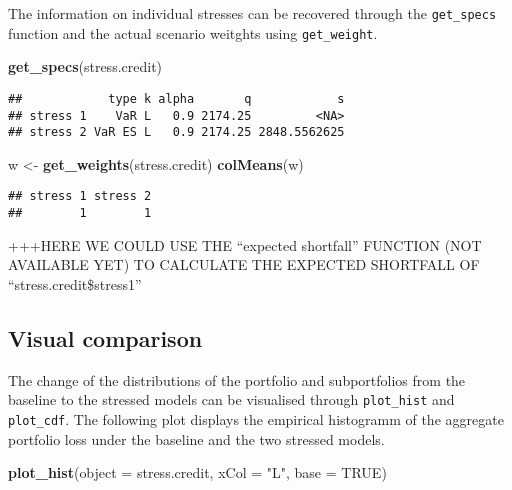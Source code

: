 \documentclass[]{article}
\newenvironment{Shaded}{\begin{snugshade}}{\end{snugshade}}
\newcommand{\DataTypeTok}[1]{\textcolor[rgb]{0.13,0.29,0.53}{#1}}
\newcommand{\KeywordTok}[1]{\textcolor[rgb]{0.13,0.29,0.53}{\textbf{#1}}}
\newcommand{\NormalTok}[1]{#1}
\newcommand{\OtherTok}[1]{\textcolor[rgb]{0.56,0.35,0.01}{#1}}
\newcommand{\StringTok}[1]{\textcolor[rgb]{0.31,0.60,0.02}{#1}}
\begin{document}
The information on individual stresses can be recovered through the \texttt{get\_specs} function and the actual scenario weitghts using \texttt{get\_weight}.

\begin{Shaded}
\begin{Highlighting}[]
\KeywordTok{get_specs}\NormalTok{(stress.credit)}
\end{Highlighting}
\end{Shaded}

\begin{verbatim}
##            type k alpha       q            s
## stress 1    VaR L   0.9 2174.25         <NA>
## stress 2 VaR ES L   0.9 2174.25 2848.5562625
\end{verbatim}

\begin{Shaded}
\begin{Highlighting}[]
\NormalTok{w <-}\StringTok{ }\KeywordTok{get_weights}\NormalTok{(stress.credit)}
\KeywordTok{colMeans}\NormalTok{(w)}
\end{Highlighting}
\end{Shaded}

\begin{verbatim}
## stress 1 stress 2 
##        1        1
\end{verbatim}

+++HERE WE COULD USE THE ``expected shortfall'' FUNCTION (NOT AVAILABLE YET) TO CALCULATE THE EXPECTED SHORTFALL OF ``stress.credit\$stress1''

\hypertarget{visual-comparison}{%
\subsection{Visual comparison}\label{visual-comparison}}

The change of the distributions of the portfolio and subportfolios from the baseline to the stressed models can be visualised through \texttt{plot\_hist} and \texttt{plot\_cdf}. The following plot displays the empirical histogramm of the aggregate portfolio loss under the baseline and the two stressed models.

\begin{Shaded}
\begin{Highlighting}[]
\KeywordTok{plot_hist}\NormalTok{(}\DataTypeTok{object =}\NormalTok{ stress.credit, }\DataTypeTok{xCol =} \StringTok{"L"}\NormalTok{, }\DataTypeTok{base =} \OtherTok{TRUE}\NormalTok{)}
\end{Highlighting}
\end{Shaded}
\end{document}

